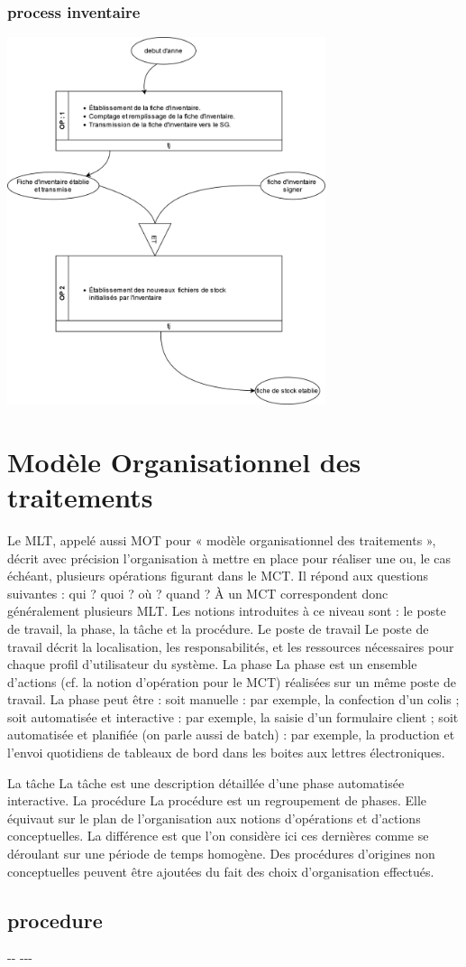 \subsubsection{process inventaire}
\includegraphics[width=0.7\textwidth]{chapter/Conceptual Study/processus/inventaire.mct.png}

\section{Modèle Organisationnel des traitements}
Le MLT, appelé aussi MOT pour « modèle organisationnel des traitements »,
décrit avec précision l’organisation à mettre en place pour réaliser une ou, le
cas échéant, plusieurs opérations figurant dans le MCT. Il répond aux
questions suivantes : qui ? quoi ? où ? quand ? À un MCT correspondent donc
généralement plusieurs MLT.
Les notions introduites à ce niveau sont : le poste de travail, la phase, la tâche
et la procédure.
Le poste de travail
Le poste de travail décrit la localisation, les responsabilités, et les
ressources nécessaires pour chaque profil d’utilisateur du système.
La phase
La phase est un ensemble d’actions (cf. la notion d’opération pour le
MCT) réalisées sur un même poste de travail.
La phase peut être :
soit manuelle : par exemple, la confection d'un colis ;
soit automatisée et interactive : par exemple, la saisie d’un
formulaire client ;
soit automatisée et planifiée (on parle aussi de batch) : par exemple,
la production et l'envoi quotidiens de tableaux de bord dans les
boites aux lettres électroniques.

La tâche
La tâche est une description détaillée d’une phase automatisée
interactive.
La procédure
La procédure est un regroupement de phases. Elle équivaut sur le plan de
l’organisation aux notions d’opérations et d’actions conceptuelles. La
différence est que l'on considère ici ces dernières comme se déroulant sur
une période de temps homogène.
Des procédures d’origines non conceptuelles peuvent être ajoutées du fait
des choix d’organisation effectués.
\subsection{procedure}
\newpage -\newpage- \newpage -\newpage -\newpage -\newpage 
